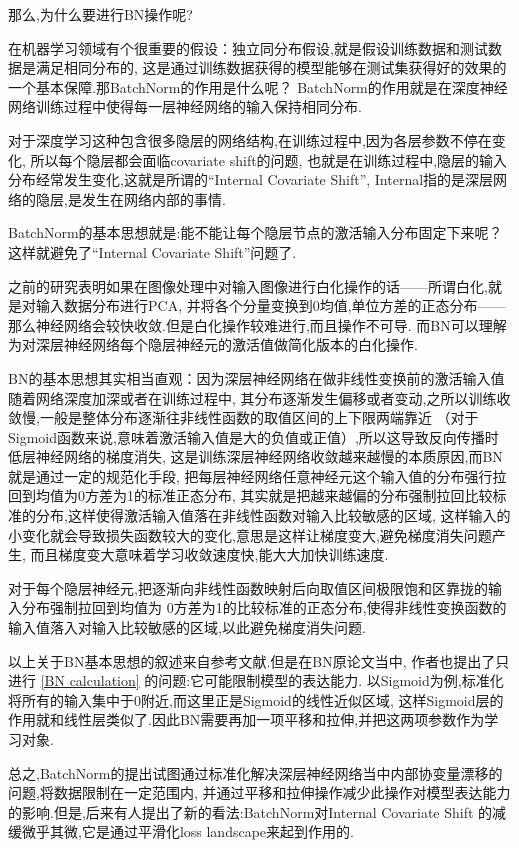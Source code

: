 那么,为什么要进行BN操作呢?

在机器学习领域有个很重要的假设：独立同分布假设,就是假设训练数据和测试数据是满足相同分布的,
这是通过训练数据获得的模型能够在测试集获得好的效果的一个基本保障.那BatchNorm的作用是什么呢？
BatchNorm的作用就是在深度神经网络训练过程中使得每一层神经网络的输入保持相同分布.

对于深度学习这种包含很多隐层的网络结构,在训练过程中,因为各层参数不停在变化,
所以每个隐层都会面临covariate shift的问题,
也就是在训练过程中,隐层的输入分布经常发生变化,这就是所谓的“Internal Covariate Shift”,
Internal指的是深层网络的隐层,是发生在网络内部的事情.

BatchNorm的基本思想就是:能不能让每个隐层节点的激活输入分布固定下来呢？
这样就避免了“Internal Covariate Shift”问题了.

之前的研究表明如果在图像处理中对输入图像进行白化操作的话——所谓白化,就是对输入数据分布进行PCA,
并将各个分量变换到0均值,单位方差的正态分布——那么神经网络会较快收敛.但是白化操作较难进行,而且操作不可导.
而BN可以理解为对深层神经网络每个隐层神经元的激活值做简化版本的白化操作.

BN的基本思想其实相当直观：因为深层神经网络在做非线性变换前的激活输入值随着网络深度加深或者在训练过程中,
其分布逐渐发生偏移或者变动,之所以训练收敛慢,一般是整体分布逐渐往非线性函数的取值区间的上下限两端靠近
（对于Sigmoid函数来说,意味着激活输入值是大的负值或正值）,所以这导致反向传播时低层神经网络的梯度消失,
这是训练深层神经网络收敛越来越慢的本质原因,而BN就是通过一定的规范化手段,
把每层神经网络任意神经元这个输入值的分布强行拉回到均值为0方差为1的标准正态分布,
其实就是把越来越偏的分布强制拉回比较标准的分布,这样使得激活输入值落在非线性函数对输入比较敏感的区域,
这样输入的小变化就会导致损失函数较大的变化,意思是这样让梯度变大,避免梯度消失问题产生,
而且梯度变大意味着学习收敛速度快,能大大加快训练速度.

对于每个隐层神经元,把逐渐向非线性函数映射后向取值区间极限饱和区靠拢的输入分布强制拉回到均值为
0方差为1的比较标准的正态分布,使得非线性变换函数的输入值落入对输入比较敏感的区域,以此避免梯度消失问题.

以上关于BN基本思想的叙述来自参考文献\cite{BN}.但是在BN原论文\cite{BNpaper}当中,
作者也提出了只进行 \ref{BN calculation} 的问题:它可能限制模型的表达能力.
以Sigmoid为例,标准化将所有的输入集中于$0$附近,而这里正是Sigmoid的线性近似区域,
这样Sigmoid层的作用就和线性层类似了.因此BN需要再加一项平移和拉伸,并把这两项参数作为学习对象.

总之,BatchNorm的提出试图通过标准化解决深层神经网络当中内部协变量漂移的问题,将数据限制在一定范围内,
并通过平移和拉伸操作减少此操作对模型表达能力的影响.但是,后来有人提出了新的看法:BatchNorm对Internal Covariate Shift
的减缓微乎其微,它是通过平滑化loss landscape来起到作用的.

